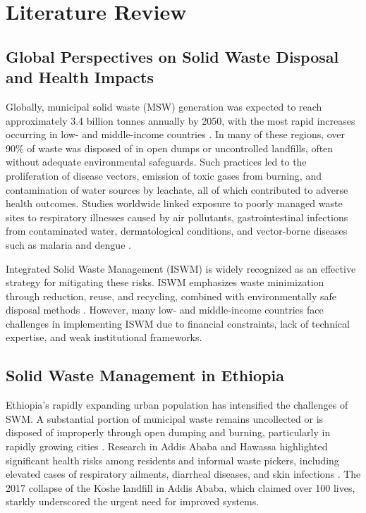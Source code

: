 
\chapter{Literature Review}
\label{chap:literature_review}

\section{Global Perspectives on Solid Waste Disposal and Health Impacts}
Globally, municipal solid waste (MSW) generation was expected to reach approximately 3.4 billion tonnes annually by 2050, with the most rapid increases occurring in low- and middle-income countries \cite{Kaza2018}. In many of these regions, over 90\% of waste was disposed of in open dumps or uncontrolled landfills, often without adequate environmental safeguards. Such practices led to the proliferation of disease vectors, emission of toxic gases from burning, and contamination of water sources by leachate, all of which contributed to adverse health outcomes. Studies worldwide linked exposure to poorly managed waste sites to respiratory illnesses caused by air pollutants, gastrointestinal infections from contaminated water, dermatological conditions, and vector-borne diseases such as malaria and dengue \cite{Porta2009, Ferronato2019}.

Integrated Solid Waste Management (ISWM) is widely recognized as an effective strategy for mitigating these risks. ISWM emphasizes waste minimization through reduction, reuse, and recycling, combined with environmentally safe disposal methods \cite{UNEP2015}. However, many low- and middle-income countries face challenges in implementing ISWM due to financial constraints, lack of technical expertise, and weak institutional frameworks.

\section{Solid Waste Management in Ethiopia}
Ethiopia’s rapidly expanding urban population has intensified the challenges of SWM. A substantial portion of municipal waste remains uncollected or is disposed of improperly through open dumping and burning, particularly in rapidly growing cities \cite{Gebremedhin2018}. Research in Addis Ababa and Hawassa highlighted significant health risks among residents and informal waste pickers, including elevated cases of respiratory ailments, diarrheal diseases, and skin infections \cite{Bogale2019, Abebe2018}. The 2017 collapse of the Koshe landfill in Addis Ababa, which claimed over 100 lives, starkly underscored the urgent need for improved systems.

